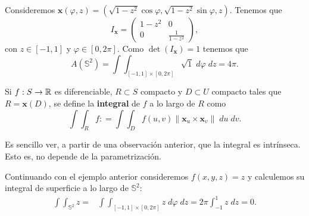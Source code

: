 \begin{eg}
	Consideremos $\displaystyle \textbf{x} \left(\varphi, z\right)=\left(\sqrt{1-z^{2}}\cos \varphi, \sqrt{1-z^{2}}\sin \varphi, z\right) $. Tenemos que 
	\[I _{ \textbf{x} } = \begin{pmatrix} 1-z^{2} & 0 \\ 0 & \frac{1}{1-z^{2}}\end{pmatrix} ,\]
	con $\displaystyle z \in \left[-1,1\right]  $ y $\displaystyle \varphi\in\left[0,2\pi \right]  $. Como $\displaystyle \det\left(I_{ \textbf{x} }\right) = 1 $ tenemos que 
	\[A\left(\mathbb{S}^{2}\right)=\int \int _{\left[-1,1\right] \times\left[0,2\pi \right] }\sqrt{1} \; d\varphi \; dz = 4\pi .\]
\end{eg}

\begin{definition}
Si $\displaystyle f : S \to \mathbb{R} $ es diferenciable, $\displaystyle R \subset S $ compacto y $\displaystyle D \subset U $ compacto tales que $\displaystyle R = \textbf{x} \left(D\right) $, se define la \textbf{integral} de $\displaystyle f $ a lo largo de $\displaystyle R $ como
\[\int \int _{R}f : = \int \int _{D}f\left(u,v\right)\| \textbf{x} _{u} \times \textbf{x} _{v}\| \; du \; dv.\]
\end{definition}
\begin{observation}
Es sencillo ver, a partir de una observación anterior, que la integral es intrínseca. Esto es, no depende de la parametrización. 
\end{observation}
\begin{eg}
Continuando con el ejemplo anterior consideremos $\displaystyle f \left(x,y,z\right)=z $ y calculemos su integral de superficie a lo largo de $\displaystyle \mathbb{S}^{2} $:
\[
\begin{split}
	\int \int _{\mathbb{S}^{2}}z = & \int \int _{\left[-1,1\right] \times\left[0,2\pi \right] }z \; d\varphi \; dz = 2\pi \int^{1}_{-1} z \; dz = 0	 .
\end{split}
\]
\end{eg}


